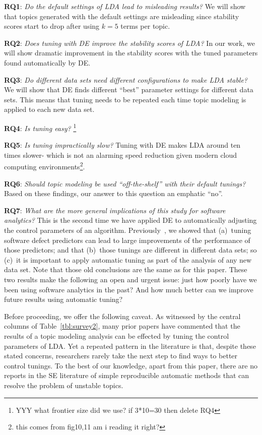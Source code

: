 \documentclass[10pt,conference]{IEEEtran}
\theoremstyle{break}
\begin{document}
\begin{compactitem}
\item \textbf{RQ1}: \textit{Do the default settings of LDA lead to misleading results?} We will show that topics generated with the default settings are misleading since  stability scores start to drop after using $k=5$ terms per topic.
    \item \textbf{RQ2}: \textit{Does tuning with DE improve the stability scores of LDA?} In our work, we will show dramatic improvement in the stability scores with the tuned parameters found automatically by DE.
    \item \textbf{RQ3}: \textit{Do different data sets
      need different configurations to make LDA stable?} We will show that DE finds different ``best''
      parameter settings for different data sets. This means that  tuning needs to be repeated each time topic
      modeling is applied to  each new data set.
    \item \textbf{RQ4}: \textit{Is tuning easy?}  \footnote{YYY what frontier size did we use?
    if 3*10=30 then delete RQ4}
    \item \textbf{RQ5}: \textit{Is tuning impractically slow?}
      Tuning with DE makes LDA around ten times slower- which is not an alarming
      speed reduction given modern cloud computing environments\footnote{this comes from fig10,11 am i reading it right?}.
    \item \textbf{RQ6}: \textit{Should topic modeling be used “off-the-shelf” with their default tunings?}
      Based on these findings, our answer to this question an emphatic ``no''.
    \item \textbf{RQ7}: \textit{What are the more general implications of this study for software analytics?}
      This is the second time we have applied DE to automatically
      adjusting the control parameters of an algorithm. Previously~\cite{fu2016tuning},
      we showed  that (a)~tuning software defect predictors can lead to large improvements of the performance
      of those predictors; and that (b)~those tunings are different in different data sets; so (c)~it is important to apply
      automatic tuning as part of the analysis of any new data set. Note that those old conclusions are the same
      as for this paper. These two results make the following an  open and urgent issue: just
      how poorly have we been using software analytics
      in the past? And how much better can we improve future results using automatic tuning?
\end{compactitem}
Before proceeding, we offer the following caveat.  As
witnessed by the central columns of Table~\ref{tbl:survey2},
many prior papers have
commented that the results of a topic modeling analysis can be effected by
tuning the control parameters of LDA.  Yet a repeated pattern in the literature
is that, despite these stated concerns,
researchers rarely take the next step
to find ways to better control tunings.
To the best of our knowledge, apart from this paper, there are no reports in the SE literature
of simple reproducible automatic methods that can resolve the problem of unstable topics.
\end{document}
